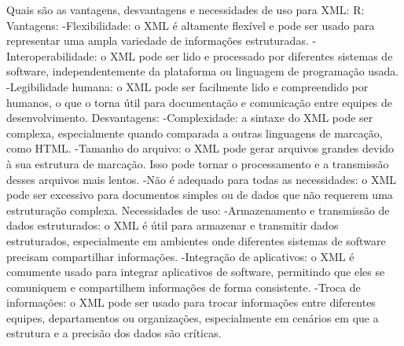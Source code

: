 Quais são as vantagens, desvantagens e necessidades de uso para XML:
R:
Vantagens:
  -Flexibilidade: o XML é altamente flexível e pode ser usado para representar uma ampla variedade de informações estruturadas.
  -Interoperabilidade: o XML pode ser lido e processado por diferentes sistemas de software, independentemente da plataforma ou linguagem de programação usada.
  -Legibilidade humana: o XML pode ser facilmente lido e compreendido por humanos, o que o torna útil para documentação e comunicação entre equipes de desenvolvimento.
Desvantagens:
  -Complexidade: a sintaxe do XML pode ser complexa, especialmente quando comparada a outras linguagens de marcação, como HTML.
  -Tamanho do arquivo: o XML pode gerar arquivos grandes devido à sua estrutura de marcação. Isso pode tornar o processamento e a transmissão desses arquivos mais lentos.
  -Não é adequado para todas as necessidades: o XML pode ser excessivo para documentos simples ou de dados que não requerem uma estruturação complexa.
Necessidades de uso:
  -Armazenamento e transmissão de dados estruturados: o XML é útil para armazenar e transmitir dados estruturados, especialmente em ambientes onde diferentes sistemas de software precisam compartilhar informações.
  -Integração de aplicativos: o XML é comumente usado para integrar aplicativos de software, permitindo que eles se comuniquem e compartilhem informações de forma consistente.
  -Troca de informações: o XML pode ser usado para trocar informações entre diferentes equipes, departamentos ou organizações, especialmente em cenários em que a estrutura e a precisão dos dados são críticas.